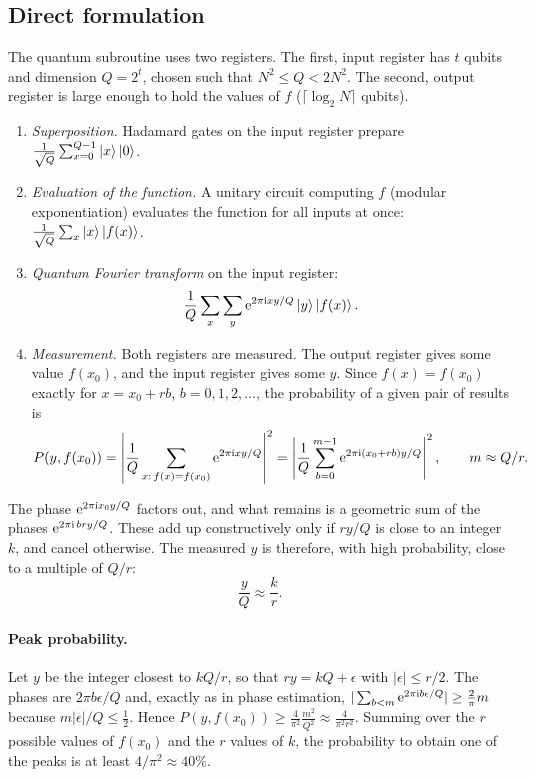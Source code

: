 \subsection{Direct formulation}
The quantum subroutine uses two registers. The first, input register has $t$ qubits and dimension $Q=2^t$, chosen such that $N^2\le Q<2N^2$. The second, output register is large enough to hold the values of $f$ ($\lceil\log_2N\rceil$ qubits).
\begin{enumerate}
  \item \emph{Superposition.} Hadamard gates on the input register prepare $\frac1{\sqrt Q}\sum_{x=0}^{Q-1}\left|x\right\rangle\left|0\right\rangle$.
  \item \emph{Evaluation of the function.} A unitary circuit computing $f$ (modular exponentiation) evaluates the function for all inputs at once: $\frac1{\sqrt Q}\sum_x\left|x\right\rangle\left|f(x)\right\rangle$.
  \item \emph{Quantum Fourier transform} on the input register:
  \begin{equation}
    \frac1Q\sum_x\sum_y\mathrm e^{2\pi\mathrm i xy/Q}\left|y\right\rangle\left|f(x)\right\rangle.
  \end{equation}
  \item \emph{Measurement.} Both registers are measured. The output register gives some value $f(x_0)$, and the input register gives some $y$. Since $f(x)=f(x_0)$ exactly for $x=x_0+rb$, $b=0,1,2,\dots$,
  the probability of a given pair of results is
  \begin{equation}
    P(y,f(x_0))=\left|\frac1Q\sum_{x:\,f(x)=f(x_0)}\mathrm e^{2\pi\mathrm i xy/Q}\right|^2=\left|\frac1Q\sum_{b=0}^{m-1}\mathrm e^{2\pi\mathrm i(x_0+rb)y/Q}\right|^2,\qquad m\approx Q/r.
  \end{equation}
\end{enumerate}
The phase $\mathrm e^{2\pi\mathrm i x_0y/Q}$ factors out, and what remains is a geometric sum of the phases $\mathrm e^{2\pi\mathrm i\,bry/Q}$. These add up constructively only if $ry/Q$ is close to an integer $k$, and cancel otherwise.
The measured $y$ is therefore, with high probability, close to a multiple of $Q/r$:
\begin{equation}
  \frac yQ\approx\frac kr .
\end{equation}
\paragraph{Peak probability.} Let $y$ be the integer closest to $kQ/r$, so that $ry=kQ+\epsilon$ with $|\epsilon|\le r/2$. The phases are $2\pi b\epsilon/Q$ and, exactly as in phase estimation,
$|\sum_{b<m}\mathrm e^{2\pi\mathrm i b\epsilon/Q}|\ge\frac2\pi m$ because $m|\epsilon|/Q\le\frac12$. Hence $P(y,f(x_0))\ge\frac4{\pi^2}\frac{m^2}{Q^2}\approx\frac4{\pi^2r^2}$. Summing over the $r$ possible values of $f(x_0)$ and
the $r$ values of $k$, the probability to obtain one of the peaks is at least $4/\pi^2\approx40\%$.

